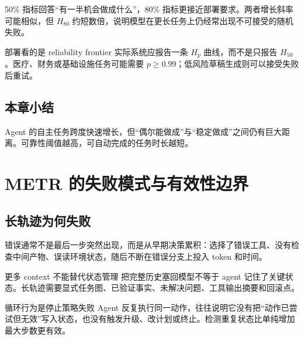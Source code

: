 \documentclass[a4paper]{article}
\begin{document}


50\% 指标回答“有一半机会做成什么”，80\% 指标更接近部署要求。两者增长斜率可能相似，但 $H_{80}$ 约短数倍，说明模型在更长任务上仍经常出现不可接受的随机失败。

\begin{importantbox}{部署看的是 reliability frontier}
实际系统应报告一条 $H_p$ 曲线，而不是只报告 $H_{50}$。医疗、财务或基础设施任务可能需要 $p\ge 0.99$；低风险草稿生成则可以接受失败后重试。
\end{importantbox}

\subsection{本章小结}

Agent 的自主任务跨度快速增长，但“偶尔能做成”与“稳定做成”之间仍有巨大距离。可靠性阈值越高，可自动完成的任务时长越短。

\section{METR 的失败模式与有效性边界}

\subsection{长轨迹为何失败}


错误通常不是最后一步突然出现，而是从早期决策累积：选择了错误工具、没有检查中间产物、误读环境状态，随后不断在错误分支上投入 token 和时间。

\begin{warningbox}{更多 context 不能替代状态管理}
把完整历史塞回模型不等于 agent 记住了关键状态。长轨迹需要显式任务图、已验证事实、未解决问题、工具输出摘要和回滚点。
\end{warningbox}

\begin{knowledgebox}{循环行为是停止策略失败}
Agent 反复执行同一动作，往往说明它没有把“动作已尝试但无效”写入状态，也没有触发升级、改计划或终止。检测重复状态比单纯增加最大步数更有效。
\end{knowledgebox}
\end{document}
